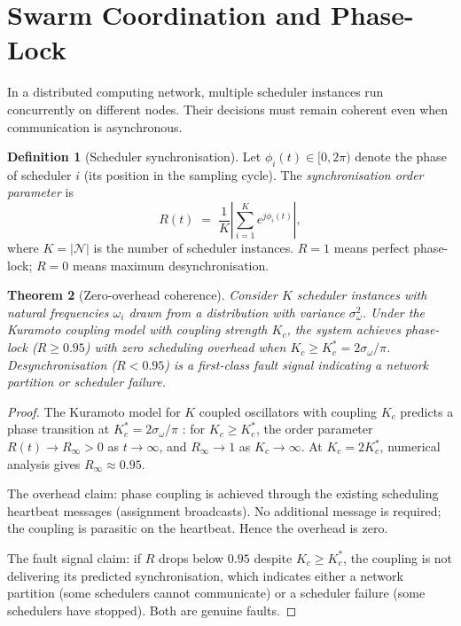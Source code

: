 \documentclass[11pt,twocolumn,a4paper]{article}
\theoremstyle{plain}
\newtheorem{theorem}{Theorem}[section]
\theoremstyle{definition}
\newtheorem{definition}[theorem]{Definition}
\theoremstyle{remark}
\newcommand{\N}{\mathcal{N}}
\newcommand{\abs}[1]{\left|#1\right|}
\begin{document}
\section{Swarm Coordination and Phase-Lock}
\label{sec:swarm}

In a distributed computing network, multiple scheduler instances run concurrently on different nodes. Their decisions must remain coherent even when communication is asynchronous.

\begin{definition}[Scheduler synchronisation]
\label{def:sync}
Let $\phi_i(t) \in [0, 2\pi)$ denote the phase of scheduler $i$ (its position in the sampling cycle). The \emph{synchronisation order parameter} is
\[
  R(t) \;=\; \frac{1}{K} \abs{\sum_{i=1}^K e^{j\phi_i(t)}},
\]
where $K = |\N|$ is the number of scheduler instances. $R = 1$ means perfect phase-lock; $R = 0$ means maximum desynchronisation.
\end{definition}

\begin{theorem}[Zero-overhead coherence]
\label{thm:phaselock}
Consider $K$ scheduler instances with natural frequencies $\omega_i$ drawn from a distribution with variance $\sigma_\omega^2$. Under the Kuramoto coupling model \cite{kuramoto1984} with coupling strength $K_c$, the system achieves phase-lock ($R \geq 0.95$) with zero scheduling overhead when $K_c \geq K_c^* = 2\sigma_\omega / \pi$. Desynchronisation ($R < 0.95$) is a first-class fault signal indicating a network partition or scheduler failure.
\end{theorem}

\begin{proof}
The Kuramoto model for $K$ coupled oscillators with coupling $K_c$ predicts a phase transition at $K_c^* = 2\sigma_\omega/\pi$ \cite{strogatz2003}: for $K_c \geq K_c^*$, the order parameter $R(t) \to R_\infty > 0$ as $t \to \infty$, and $R_\infty \to 1$ as $K_c \to \infty$. At $K_c = 2K_c^*$, numerical analysis gives $R_\infty \approx 0.95$.

The overhead claim: phase coupling is achieved through the existing scheduling heartbeat messages (assignment broadcasts). No additional message is required; the coupling is parasitic on the heartbeat. Hence the overhead is zero.

The fault signal claim: if $R$ drops below $0.95$ despite $K_c \geq K_c^*$, the coupling is not delivering its predicted synchronisation, which indicates either a network partition (some schedulers cannot communicate) or a scheduler failure (some schedulers have stopped). Both are genuine faults.
\end{proof}
\end{document}

